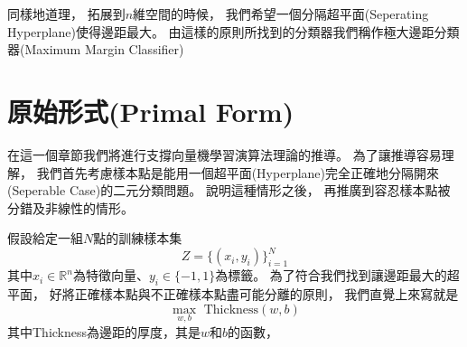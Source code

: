   同樣地道理，
  拓展到$n$維空間的時候，
  我們希望一個分隔超平面(Seperating Hyperplane)使得邊距最大。
  由這樣的原則所找到的分類器我們稱作極大邊距分類器(Maximum Margin Classifier)    

\section{原始形式(Primal Form)}
  在這一個章節我們將進行支撐向量機學習演算法理論的推導。
  為了讓推導容易理解，
  我們首先考慮樣本點是能用一個超平面(Hyperplane)完全正確地分隔開來(Seperable Case)的二元分類問題。
  說明這種情形之後，
  再推廣到容忍樣本點被分錯及非線性的情形。

  假設給定一組$N$點的訓練樣本集
  \begin{equation}
  Z = \lbrace (x_i, y_i) \rbrace_{i=1}^{N}
  \end{equation}
  其中$x_i \in \mathbb{R}^n$為特徵向量、$y_i \in \lbrace -1, 1 \rbrace$為標籤。
  為了符合我們找到讓邊距最大的超平面，
  好將正確樣本點與不正確樣本點盡可能分離的原則，
  我們直覺上來寫就是
  \begin{equation}
    \max_{w, b} \text{ Thickness}(w, b)
  \end{equation}
  其中Thickness為邊距的厚度，其是$w$和$b$的函數，
  
